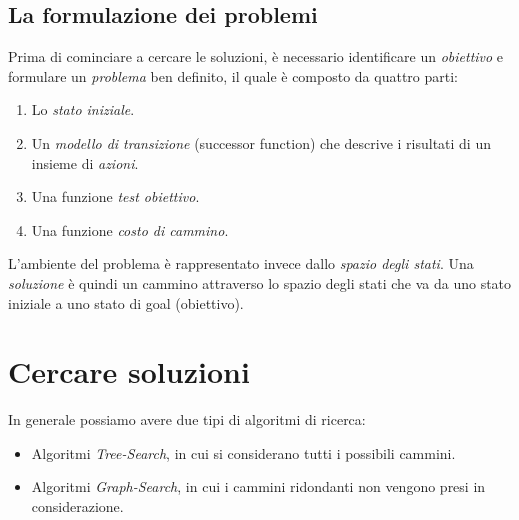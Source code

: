 \documentclass[11pt,oneside]{book}
\begin{document}
\subsection{La formulazione dei problemi}
Prima di cominciare a cercare le soluzioni, è necessario identificare un \textit{obiettivo} e formulare un \textit{problema} ben definito, il quale è composto da quattro parti:
\begin{enumerate}
	\item Lo \textit{stato iniziale}.
	\item Un \textit{modello di transizione} (successor function) che descrive i risultati di un insieme di \textit{azioni}.
	\item Una funzione \textit{test obiettivo}.
	\item Una funzione \textit{costo di cammino}.
\end{enumerate}
L'ambiente del problema è rappresentato invece dallo \textit{spazio degli stati}. Una \textit{soluzione} è quindi un cammino attraverso lo spazio degli stati che va da uno stato iniziale a uno stato di goal (obiettivo).

\section{Cercare soluzioni}
In generale possiamo avere due tipi di algoritmi di ricerca:
\begin{itemize}
    \item Algoritmi \emph{Tree-Search}, in cui si considerano tutti i possibili cammini.
    \item Algoritmi \emph{Graph-Search}, in cui i cammini ridondanti non vengono presi in considerazione.
\end{itemize}
\end{document}
